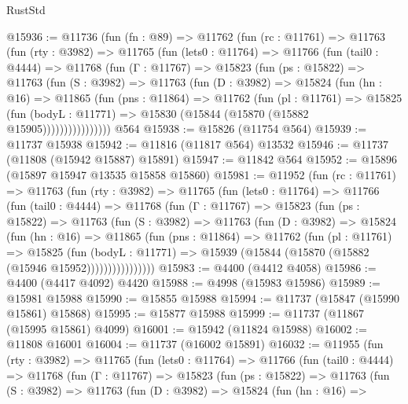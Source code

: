 \begin{lexlean}{RustStd}
\begin{coremodule}
@15936 := @11736
    (fun (fn : @89) =>
    @11762
      (fun (rc : @11761) =>
      @11763
        (fun (rty : @3982) =>
        @11765
          (fun (lets0 : @11764) =>
          @11766
            (fun (tail0 : @4444) =>
            @11768
              (fun (Γ : @11767) =>
              @15823
                (fun (ps : @15822) =>
                @11763
                  (fun (S : @3982) =>
                  @11763
                    (fun (D : @3982) =>
                    @15824
                      (fun (hn : @16) =>
                      @11865
                        (fun (pns : @11864) =>
                        @11762
                          (fun (pl : @11761) =>
                          @15825
                            (fun (bodyL : @11771) =>
                            @15830 (@15844 (@15870 (@15882 @15905))))))))))))))))
    @564
@15938 := @15826 (@11754 @564)
@15939 := @11737 @15938
@15942 := @11816 (@11817 @564) @13532
@15946 := @11737 (@11808 (@15942 @15887) @15891)
@15947 := @11842 @564
@15952 := @15896 (@15897 @15947 @13535 @15858 @15860)
@15981 := @11952
    (fun (rc : @11761) =>
    @11763
      (fun (rty : @3982) =>
      @11765
        (fun (lets0 : @11764) =>
        @11766
          (fun (tail0 : @4444) =>
          @11768
            (fun (Γ : @11767) =>
            @15823
              (fun (ps : @15822) =>
              @11763
                (fun (S : @3982) =>
                @11763
                  (fun (D : @3982) =>
                  @15824
                    (fun (hn : @16) =>
                    @11865
                      (fun (pns : @11864) =>
                      @11762
                        (fun (pl : @11761) =>
                        @15825
                          (fun (bodyL : @11771) =>
                          @15939 (@15844 (@15870 (@15882 (@15946 @15952))))))))))))))))
@15983 := @4400 (@4412 @4058)
@15986 := @4400 (@4417 @4092) @4420
@15988 := @4998 (@15983 @15986)
@15989 := @15981 @15988
@15990 := @15855 @15988
@15994 := @11737 (@15847 (@15990 @15861) @15868)
@15995 := @15877 @15988
@15999 := @11737 (@11867 (@15995 @15861) @4099)
@16001 := @15942 (@11824 @15988)
@16002 := @11808 @16001
@16004 := @11737 (@16002 @15891)
@16032 := @11955
    (fun (rty : @3982) =>
    @11765
      (fun (lets0 : @11764) =>
      @11766
        (fun (tail0 : @4444) =>
        @11768
          (fun (Γ : @11767) =>
          @15823
            (fun (ps : @15822) =>
            @11763
              (fun (S : @3982) =>
              @11763
                (fun (D : @3982) =>
                @15824
                  (fun (hn : @16) =>

\end{coremodule}
\end{lexlean}
